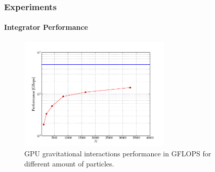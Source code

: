 \begin{frame}
    \frametitle{Experiments}
    \framesubtitle{Integrator Performance}




\begin{figure}[H]
    \centering
    \label{fig:gflops}
    \includegraphics[width=0.65\textwidth]{img/test_gflops.pdf}
    \caption{GPU gravitational interactions performance in GFLOPS for different amount of particles.}
\end{figure}

\end{frame}
